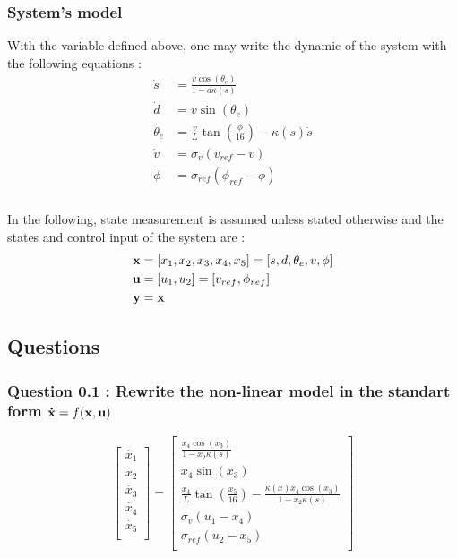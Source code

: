 \subsubsection*{System's model}
With the variable defined above, one may write the dynamic of the system with the following equations :
\begin{align}
    \dot{s} &= \frac{v \cos(\theta_e)}{1 - d\kappa(s)}\\
    \dot{d} &= v \sin(\theta_e)\\
    \dot{\theta_e} &= \frac{v}{L}\tan(\frac{\phi}{16}) - \kappa(s)\dot{s}\\
    \dot{v} &= \sigma_v (v_{ref} - v)\\
    \dot{\phi} &= \sigma_{ref} (\phi_{ref} - \phi)\\
\end{align}
\\
In the following, state measurement is assumed unless stated otherwise and the states and control input of the system are :
\begin{align}
    \bold{x} &= [x_1, x_2, x_3, x_4, x_5] = [s,d,\theta_e, v, \phi]\\
    \bold{u} &= [u_1, u_2] = [v_{ref}, \phi_{ref}]\\
    \bold{y} &= \bold{x}
\end{align}


\subsection{Questions}
\subsubsection*{Question 0.1 : Rewrite the non-linear model in the standart form $\bold{\dot{x}} = f(\bold{x}, \bold{u})$}
\begin{equation}
    \left[ {\begin{array}{c}
        \dot{x_1}\\
        \dot{x_2}\\
        \dot{x_3}\\
        \dot{x_4}\\
        \dot{x_5}\\
    \end{array} } \right]
    =
    \left[ {\begin{array}{c}
        \frac{x_4 \cos(x_3)}{1 - x_2\kappa(s)}\\
        x_4 \sin(x_3)\\
        \frac{x_4}{L}\tan(\frac{x_5}{16}) - \frac{\kappa(x) x_4 \cos(x_3)}{1 - x_2 \kappa(s)}\\
        \sigma_v (u_1 - x_4)\\
        \sigma_{ref} (u_2 - x_5)\\
    \end{array} } \right]
\end{equation}



